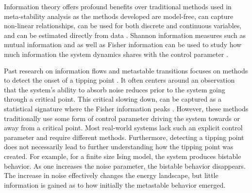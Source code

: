 \documentclass[a4paper, 11pt, twocolumn]{article}
\begin{document}
Information theory offers profound benefits over traditional
methods  used  in  meta-stability analysis  as  the  methods
developed   are    model-free,   can    capture   non-linear
relationships, can be used  for both discrete and continuous
variables,  and   can  be   estimated  directly   from  data
\cite{Cover2005}. Shannon information  measures such as mutual
information and as well as Fisher information can be used to
study how  much information the system  dynamics shares with
the control parameter \cite{Nicolis2016,Lizier2010}.

Past   research   on   information  flows   and   metastable
transitions  focuses on  methods to  detect the  onset of  a
tipping point \cite{Scheffer2009,Prokopenko2011,Scheffer2001}.
It  often centers  around an  observation that  the system's
ability to  absorb noise reduces  prior to the  system going
through a critical point. This critical slowing down, can be
captured  as  a  statistical   signature  where  the  Fisher
information  peaks  \cite{Eason2014}. However,  these  methods
traditionally use some form of control parameter driving the
system  towards   or  away  from  a   critical  point.  Most
real-world systems  lack such an explicit  control parameter
and  require  different  methods. Furthermore,  detecting  a
tipping  point   does  not   necessarily  lead   to  further
understanding  how  the  tipping   point  was  created.  For
example, for a finite size  Ising model, the system produces
bistable behavior. As one increases the noise parameter, the
bistable   behavior  disappears.   The  increase   in  noise
effectively  changes   the  energy  landscape,   but  little
information  is gained  as to  how initially  the metastable
behavior emerged.
\end{document}
